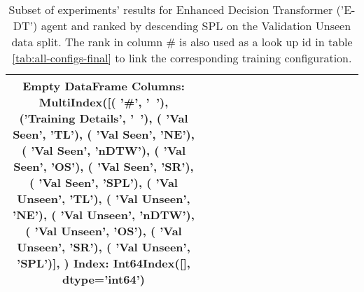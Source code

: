 \begin{table}
\centering
\caption{\label{tab:e_dt_normalized_visual_features}Subset of experiments' results for Enhanced Decision Transformer ('E-DT') agent and ranked by descending SPL on the Validation Unseen data split. The rank in column \# is also used as a look up id in table \ref{tab:all-configs-final} to link the corresponding training configuration.}
\begin{tabular}{@{\hskip3pt}c@{\hskip3pt}c@{\hskip3pt}c@{\hskip3pt}c@{\hskip3pt}c@{\hskip3pt}c@{\hskip3pt}c@{\hskip3pt}c@{\hskip3pt}c@{\hskip3pt}c@{\hskip3pt}c@{\hskip3pt}c@{\hskip3pt}c@{\hskip3pt}c@{\hskip3pt}c}
\toprule
Empty DataFrame
Columns: MultiIndex([(              '\textbf{\#}',    '\textbf{~}'),
            ('\textbf{Training Details}',    '\textbf{~}'),
            (        '\textbf{Val Seen}',   '\textbf{TL}'),
            (        '\textbf{Val Seen}',   '\textbf{NE}'),
            (        '\textbf{Val Seen}', '\textbf{nDTW}'),
            (        '\textbf{Val Seen}',   '\textbf{OS}'),
            (        '\textbf{Val Seen}',   '\textbf{SR}'),
            (        '\textbf{Val Seen}',  '\textbf{SPL}'),
            (      '\textbf{Val Unseen}',   '\textbf{TL}'),
            (      '\textbf{Val Unseen}',   '\textbf{NE}'),
            (      '\textbf{Val Unseen}', '\textbf{nDTW}'),
            (      '\textbf{Val Unseen}',   '\textbf{OS}'),
            (      '\textbf{Val Unseen}',   '\textbf{SR}'),
            (      '\textbf{Val Unseen}',  '\textbf{SPL}')],
           )
Index: Int64Index([], dtype='int64') \\
\bottomrule
\end{tabular}
\end{table}

